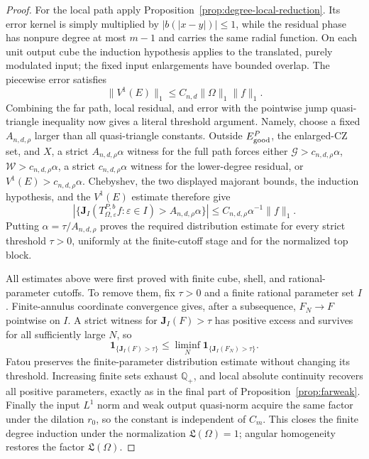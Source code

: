 \documentclass[11pt]{article}
\numberwithin{equation}{section}
\theoremstyle{remark}
\theoremstyle{definition}
\begin{document}
\begin{proof}
For the local path apply
Proposition~\ref{prop:degree-local-reduction}. Its error kernel is simply
multiplied by $|b(|x-y|)|\le1$, while the residual phase has nonpure
degree at most $m-1$ and carries the same radial function. On each unit
output cube the induction hypothesis applies to the translated,
purely modulated input; the fixed input enlargements have bounded
overlap. The piecewise error satisfies
\[
 \|V^1(E)\|_1
 \le C_{n,d}\|\Omega\|_1\|f\|_1.
\]
Combining the far path, local residual, and error with the pointwise jump
quasi-triangle inequality now gives a literal threshold argument.  Namely,
choose a fixed $A_{n,d,\rho}$ larger than all quasi-triangle constants.
Outside $E_{\rm good}^P$, the enlarged-CZ set, and $X$, a strict
$A_{n,d,\rho}\alpha$ witness for the full path forces either
$\mathcal G>c_{n,d,\rho}\alpha$,
$\mathcal W>c_{n,d,\rho}\alpha$, a strict
$c_{n,d,\rho}\alpha$ witness for the lower-degree residual, or
$V^1(E)>c_{n,d,\rho}\alpha$.  Chebyshev, the two displayed majorant
bounds, the induction hypothesis, and the $V^1(E)$ estimate therefore give
\[
 |\{\mathbf J_I(T^{P,b}_{\Omega,\varepsilon}f:
                    \varepsilon\in I)>
       A_{n,d,\rho}\alpha\}|
 \le C_{n,d,\rho}\alpha^{-1}\|f\|_1.
\]
Putting $\alpha=\tau/A_{n,d,\rho}$ proves the required distribution
estimate for every strict threshold $\tau>0$, uniformly at the
finite-cutoff stage and for the normalized top block.

All estimates above were first proved with finite cube, shell, and
rational-parameter cutoffs.  To remove them, fix $\tau>0$ and a finite
rational parameter set $I$.  Finite-annulus coordinate convergence gives,
after a subsequence, $F_N\to F$ pointwise on $I$.  A strict witness for
$\mathbf J_I(F)>\tau$ has positive excess and survives for all sufficiently
large $N$, so
\[
 \mathbf1_{\{\mathbf J_I(F)>\tau\}}
 \le\liminf_N\mathbf1_{\{\mathbf J_I(F_N)>\tau\}}.
\]
Fatou preserves the finite-parameter distribution estimate without
changing its threshold.  Increasing finite sets exhaust
$\mathbb Q_+$, and local absolute continuity recovers all positive
parameters, exactly as in the final part of
Proposition~\ref{prop:farweak}. Finally the input $L^1$ norm and weak output quasi-norm acquire
the same factor under the dilation $r_0$, so the constant is independent
of $C_m$. This closes the finite degree induction under the normalization
$\mathfrak L(\Omega)=1$; angular homogeneity restores the factor
$\mathfrak L(\Omega)$.
\end{proof}
\end{document}
